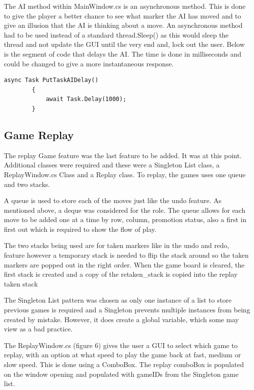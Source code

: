 \documentclass[10pt, a4paper]{article}
\begin{document}
The AI method within MainWindow.cs is an asynchronous method. This is done to give the player a better chance to see what marker the AI has moved and to give an illusion that the AI is thinking about a move. An asynchronous method had to be used instead of a standard thread.Sleep() as this would sleep the thread and not update the GUI until the very end and, lock out the user.
Below is the segment of code that delays the AI. The time is done in milliseconds and could be changed to give a more instantaneous response.

\begin{lstlisting}[caption =code to delay the AI for 1 second]
 async Task PutTaskAIDelay()
        {
            await Task.Delay(1000);
        }
\end{lstlisting}
	
	\subsection{Game Replay}
The replay Game feature was the last feature to be added. It was at this point. Additional classes were required and these were a Singleton List class, a ReplayWindow.cs Class and a Replay class. To replay, the games uses one queue and two stacks. 

A queue is used to store each of the moves just like the undo feature. As mentioned above, a deque was considered for the role. The queue allows for each move to be added one at a time by row, column, promotion status, also a first in first out which is required to show the flow of play. 

The two stacks being used are for taken markers like in the undo and redo, feature however a temporary stack is needed to flip the stack around so the taken markers are popped out in the right order. When the game board is cleared, the first stack is created and a copy of the retaken\_stack is copied into the replay taken stack

The Singleton List pattern was chosen as only one instance of a list to store previous games is required and a Singleton prevents multiple instances from being created by mistake. However, it does create a global variable, which some may view as a bad practice.

The ReplayWindow.cs (figure 6) gives the user a GUI to select which game to replay, with an option at what speed to play the game back at fast, medium or slow speed. This is done using a ComboBox. The replay comboBox is populated on the window opening and populated with gameIDs from the Singleton game list.
\end{document}
